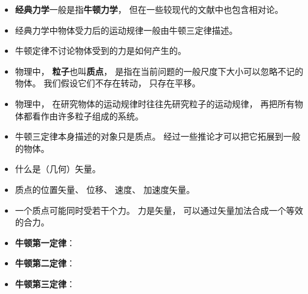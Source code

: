 
\begin{issues}
\issueDraft
\end{issues}

\begin{itemize}
\item \textbf{经典力学}一般是指\textbf{牛顿力学}， 但在一些较现代的文献中也包含相对论。
\item 经典力学中物体受力后的运动规律一般由牛顿三定律描述。
\item 牛顿定律不讨论物体受到的力是如何产生的。
\item 物理中， \textbf{粒子}也叫\textbf{质点}， 是指在当前问题的一般尺度下大小可以忽略不记的物体。 我们假设它们不存在转动， 只存在平移。
\item 物理中， 在研究物体的运动规律时往往先研究粒子的运动规律， 再把所有物体都看作由许多粒子组成的系统。
\item 牛顿三定律本身描述的对象只是质点。 经过一些推论才可以把它拓展到一般的物体。
\item 什么是（几何）矢量。
\item 质点的位置矢量、 位移、 速度、 加速度矢量。
\item 一个质点可能同时受若干个力。 力是矢量， 可以通过矢量加法合成一个等效的合力。
\item \textbf{牛顿第一定律}：
\item \textbf{牛顿第二定律}：
\item \textbf{牛顿第三定律}：
\end{itemize}
